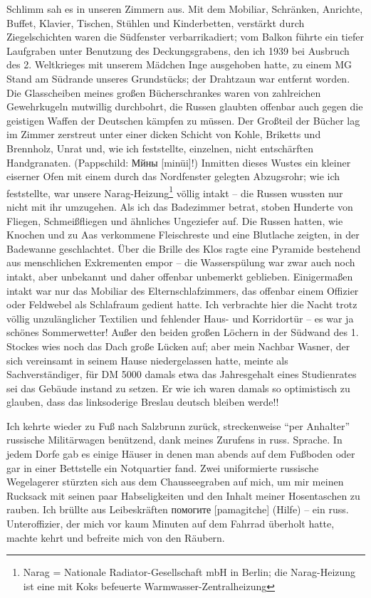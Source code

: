 \documentclass[a5paper,pagesize,10pt,twoside=true]{scrbook}
\newcommand\textcyr[1]{{\fontencoding{OT2}\fontfamily{wncyr}\selectfont #1}}	%
\renewcommand{\marginpar}[2][]{}
\begin{document}
\marginpar{88} Schlimm sah es in unseren Zimmern aus. Mit dem Mobiliar, Schränken, Anrichte, Buffet, Klavier, Tischen, Stühlen und Kinderbetten, verstärkt durch Ziegelschichten waren die Südfenster verbarrikadiert; vom Balkon führte ein tiefer Laufgraben unter Benutzung des Deckungsgrabens, den ich 1939 bei Ausbruch des 2. Weltkrieges mit unserem Mädchen Inge ausgehoben hatte, zu einem MG Stand am Südrande unseres Grundstücks; der Drahtzaun war entfernt worden. Die Glasscheiben meines großen Bücherschrankes waren von zahlreichen Gewehrkugeln mutwillig durchbohrt, die Russen glaubten offenbar auch gegen die geistigen Waffen der Deutschen kämpfen zu müssen. Der Großteil der Bücher lag im Zimmer zerstreut unter einer dicken Schicht von Kohle, Briketts und Brennholz, Unrat und, wie ich feststellte, einzelnen, nicht entschärften Handgranaten. \marginpar{89} (Pappschild: \textcyr{Мйны} [minüi]!) Inmitten dieses Wustes ein kleiner eiserner Ofen mit einem durch das Nordfenster gelegten Abzugsrohr; wie ich feststellte, war unsere Narag-Heizung\footnote{Narag = Nationale Radiator-Gesellschaft mbH in Berlin; die Narag-Heizung ist eine mit Koks befeuerte Warmwasser-Zentralheizung} völlig intakt -- die Russen wussten nur nicht mit ihr umzugehen. Als ich das Badezimmer betrat, stoben Hunderte von Fliegen, Schmeißfliegen und ähnliches Ungeziefer auf. Die Russen hatten, wie Knochen und zu Aas verkommene Fleischreste und eine Blutlache zeigten, in der Badewanne geschlachtet. Über die Brille des Klos ragte eine Pyramide bestehend aus menschlichen Exkrementen empor -- die Wasserspülung war zwar auch noch intakt, aber unbekannt und daher offenbar unbemerkt geblieben. Einigermaßen intakt war nur das Mobiliar des Elternschlafzimmers, das offenbar einem Offizier oder Feldwebel als Schlafraum gedient hatte. Ich verbrachte hier die Nacht trotz völlig unzulänglicher Textilien und fehlender Haus- und Korridortür -- es war ja schönes Sommerwetter! Außer den beiden großen Löchern in der Südwand des 1. Stockes wies noch das Dach große Lücken auf; aber mein Nachbar Wasner, der sich \marginpar{90} vereinsamt in seinem Hause niedergelassen hatte, meinte als Sachverständiger, für DM 5000 damals etwa das Jahresgehalt eines Studienrates sei das Gebäude instand zu setzen. Er wie ich waren damals so optimistisch zu glauben, dass das linksoderige Breslau deutsch bleiben werde!!

Ich kehrte wieder zu Fuß nach Salzbrunn zurück, streckenweise \enquote{per Anhalter} russische Militärwagen benützend, dank meines Zurufens in russ. Sprache. In jedem Dorfe gab es einige Häuser in denen man abends auf dem Fußboden oder gar in einer Bettstelle ein Notquartier fand. Zwei uniformierte russische Wegelagerer stürzten sich aus dem Chausseegraben auf mich, um mir meinen Rucksack mit seinen paar Habseligkeiten und den Inhalt meiner Hosentaschen zu rauben. Ich brüllte aus Leibeskräften \textcyr{помогите} [pamagitche] (Hilfe) -- ein russ. Unteroffizier, der mich vor kaum Minuten auf dem Fahrrad überholt hatte, machte kehrt und befreite mich von den Räubern.
\end{document}
